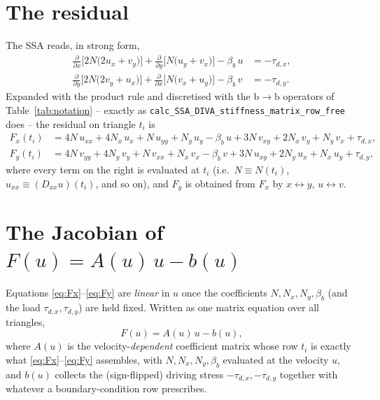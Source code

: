 \documentclass[11pt]{article}
\newcommand{\code}[1]{\texttt{#1}}
\newcommand{\ti}{t_i}
\begin{document}
\section{The residual}
\label{sec:residual}

The SSA reads, in strong form,
\begin{align}
\frac{\partial}{\partial x}\Big[2N\big(2u_x+v_y\big)\Big] + \frac{\partial}{\partial y}\Big[N\big(u_y+v_x\big)\Big] - \beta_b\, u &= -\tau_{d,x}, \\
\frac{\partial}{\partial y}\Big[2N\big(2v_y+u_x\big)\Big] + \frac{\partial}{\partial x}\Big[N\big(v_x+u_y\big)\Big] - \beta_b\, v &= -\tau_{d,y}.
\end{align}
Expanded with the product rule and discretised with the b$\to$b operators of
Table~\ref{tab:notation} -- exactly as
\code{calc\_\allowbreak SSA\_\allowbreak DIVA\_\allowbreak stiffness\_\allowbreak matrix\_\allowbreak row\_\allowbreak free} does -- the residual on
triangle $\ti$ is
\begin{align}
F_x(\ti) &= 4N\,u_{xx} + 4N_x\,u_x + N\,u_{yy} + N_y\,u_y - \beta_b\,u
  + 3N\,v_{xy} + 2N_x\,v_y + N_y\,v_x + \tau_{d,x}, \label{eq:Fx}\\
F_y(\ti) &= 4N\,v_{yy} + 4N_y\,v_y + N\,v_{xx} + N_x\,v_x - \beta_b\,v
  + 3N\,u_{xy} + 2N_y\,u_x + N_x\,u_y + \tau_{d,y}, \label{eq:Fy}
\end{align}
where every term on the right is evaluated at $\ti$ (i.e.\ $N \equiv N(\ti)$,
$u_{xx}\equiv(D_{xx}u)(\ti)$, and so on), and $F_y$ is obtained from $F_x$ by
$x\leftrightarrow y$, $u\leftrightarrow v$.

\section{The Jacobian of \texorpdfstring{$F(u) = A(u)\,u - b(u)$}{F(u) = A(u) u - b(u)}}
\label{sec:picard}

Equations \eqref{eq:Fx}--\eqref{eq:Fy} are \emph{linear} in $u$ once the
coefficients $N,N_x,N_y,\beta_b$ (and the load $\tau_{d,x},\tau_{d,y}$) are
held fixed. Written as one matrix equation over all triangles,
\begin{equation}
F(u) = A(u)\,u - b(u),
\label{eq:F_matrix_form}
\end{equation}
where $A(u)$ is the velocity-\emph{dependent} coefficient matrix whose row
$\ti$ is exactly what \eqref{eq:Fx}--\eqref{eq:Fy} assembles, with
$N,N_x,N_y,\beta_b$ evaluated at the velocity $u$, and $b(u)$ collects the
(sign-flipped) driving stress $-\tau_{d,x},-\tau_{d,y}$ together with whatever
a boundary-condition row prescribes.
\end{document}
